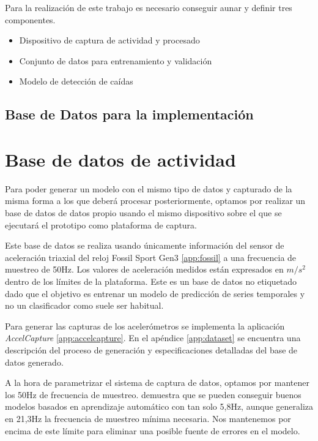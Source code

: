 Para la realización de este trabajo es necesario conseguir aunar y definir tres componentes.
\begin{itemize}
  \item Dispositivo de captura de actividad y procesado
  \item Conjunto de datos para entrenamiento y validación
  \item Modelo de detección de caídas
\end{itemize}




\subsection{Base de Datos para la implementación}


\section{Base de datos de actividad}\label{req_base de datos}
Para poder generar un modelo con el mismo tipo de datos y capturado de la misma forma a los que deberá procesar posteriormente, optamos por realizar un base de datos de datos propio usando el mismo dispositivo sobre el que se ejecutará el prototipo como plataforma de captura.

Este base de datos se realiza usando únicamente información del sensor de aceleración triaxial del reloj Fossil Sport Gen3 \ref{app:fossil} a una frecuencia de muestreo de 50Hz. Los valores de aceleración medidos están expresados en $m/s^2$ dentro de los límites de la plataforma. Este es un base de datos no etiquetado dado que el objetivo es entrenar un modelo de predicción de series temporales y no un clasificador como suele ser habitual.

Para generar las capturas de los acelerómetros se implementa la aplicación \textit{AccelCapture} \ref{app:accelcapture}. En el apéndice \ref{app:dataset} se encuentra una descripción del proceso de generación y especificaciones detalladas del base de datos generado.

A la hora de parametrizar el sistema de captura de datos, optamos por mantener los 50Hz de frecuencia de muestreo. \cite{Liu2018} demuestra que se pueden conseguir buenos modelos basados en aprendizaje automático con tan solo 5,8Hz, aunque generaliza en 21,3Hz la frecuencia de muestreo mínima necesaria. Nos mantenemos por encima de este límite para eliminar una posible fuente de errores en el modelo.


